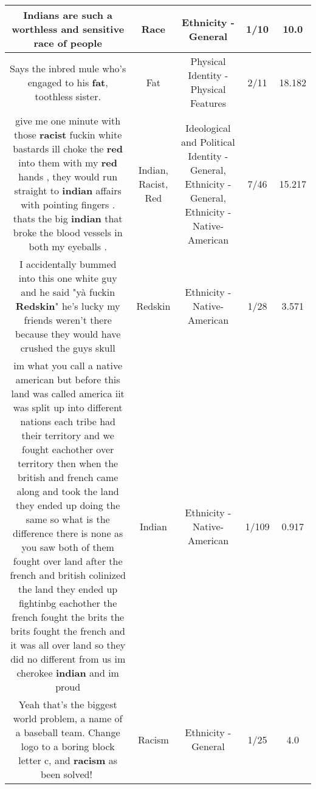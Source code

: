 \documentclass[11pt]{article}
\newlength\mylength
\begin{document}
\begin{center}
\begin{longtable}{|C{.65\mylength}|C{.30\mylength}|C{.12\mylength}|C{.12\mylength}|C{.12\mylength}|}
  \small Indians are such a worthless and sensitive \textbf{race} of people\normalsize   & Race & Ethnicity - General & 1/10 & 10.0 \\  \hline
  \small Says the inbred mule who's engaged to his \textbf{fat}, toothless sister.\normalsize   & Fat & Physical Identity - Physical Features & 2/11 & 18.182 \\  \hline
  \small give me one minute with those \textbf{racist} fuckin white bastards ill choke the \textbf{r\textbf{ed}} into them with my \textbf{r\textbf{ed}} hands , they would run straight to \textbf{indian} affairs with pointing fingers . thats the big \textbf{indian} that broke the blood vessels in both my eyeballs .\normalsize   & Indian, Racist, Red &  Ideological and Political Identity - General, Ethnicity - General, Ethnicity - Native-American & 7/46 & 15.217 \\  \hline
  \small I accidentally bummed into this one white guy and he said "yà fuckin \textbf{Redskin}" he's lucky my friends weren't there because they would have crushed the guys skull\normalsize   & Redskin & Ethnicity - Native-American & 1/28 & 3.571 \\  \hline
  \small im what you call a native american but before this land was called america iit was split up into different nations each tribe had their territory and we fought eachother over territory then when the british and french came along and took the land they ended up doing the same so what is the difference there is none as you saw  both of them fought over land after the french and british colinized the land they ended up fightinbg eachother  the french fought the brits the brits fought the french and it was all over land so they did no different from us im cherokee \textbf{indian} and im proud\normalsize   & Indian & Ethnicity - Native-American & 1/109 & 0.917 \\  \hline
  \small Yeah that's the biggest world problem, a name of a baseball team. Change logo to a boring block letter c, and \textbf{racism} as been solved!👏\normalsize   & Racism & Ethnicity - General & 1/25 & 4.0 \\  \hline

\end{longtable}
\end{center}
\end{document}
